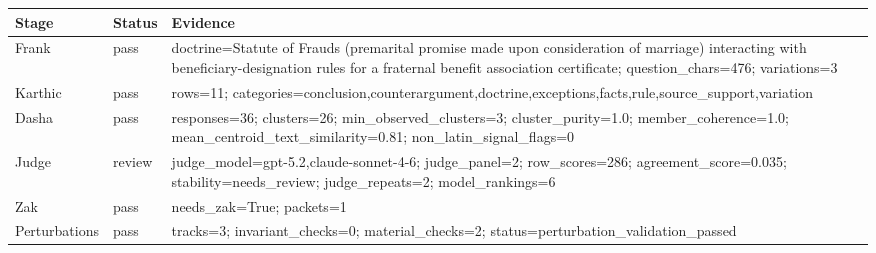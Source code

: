 \begin{tabular}{lll}
\toprule
Stage & Status & Evidence \\
\midrule
Frank & pass & doctrine=Statute of Frauds (premarital promise made upon consideration of marriage) interacting with beneficiary-designation rules for a fraternal benefit association certificate; question\_chars=476; variations=3 \\
Karthic & pass & rows=11; categories=conclusion,counterargument,doctrine,exceptions,facts,rule,source\_support,variation \\
Dasha & pass & responses=36; clusters=26; min\_observed\_clusters=3; cluster\_purity=1.0; member\_coherence=1.0; mean\_centroid\_text\_similarity=0.81; non\_latin\_signal\_flags=0 \\
Judge & review & judge\_model=gpt-5.2,claude-sonnet-4-6; judge\_panel=2; row\_scores=286; agreement\_score=0.035; stability=needs\_review; judge\_repeats=2; model\_rankings=6 \\
Zak & pass & needs\_zak=True; packets=1 \\
Perturbations & pass & tracks=3; invariant\_checks=0; material\_checks=2; status=perturbation\_validation\_passed \\
\bottomrule
\end{tabular}
